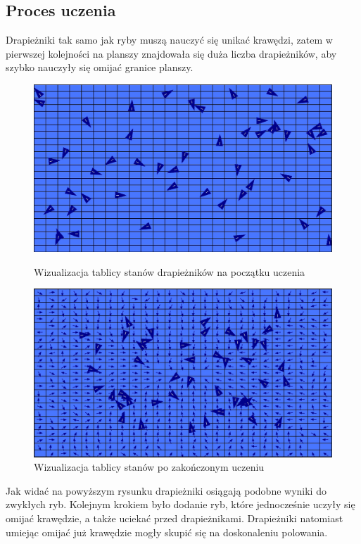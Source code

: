 \documentclass{article}
\begin{document}
\subsection{Proces uczenia}
Drapieżniki tak samo jak ryby muszą nauczyć się unikać krawędzi, zatem w pierwszej kolejności na planszy znajdowała się duża liczba drapieżników, aby szybko nauczyły się omijać granice planszy.
\begin{figure}[H]
    \begin{minipage}{0.48\textwidth}
        \centering
        \includegraphics[width=\textwidth]{7_Predator_Qtable_init.jpg}
        \caption{Wizualizacja tablicy stanów drapieżników na początku uczenia}
    \end{minipage}
    \hspace{0.02\textwidth}
    \begin{minipage}{0.48\textwidth}
        \centering
        \includegraphics[width=\textwidth]{8_Predator_learning_result.jpg}
        \caption{Wizualizacja tablicy stanów po zakończonym uczeniu}
    \end{minipage}
\end{figure}
Jak widać na powyższym rysunku drapieżniki osiągają podobne wyniki do zwykłych ryb.
Kolejnym krokiem było dodanie ryb, które jednocześnie uczyły się omijać krawędzie, a także uciekać przed drapieżnikami. Drapieżniki natomiast umiejąc omijać już krawędzie mogły skupić się na doskonaleniu polowania.
\end{document}
